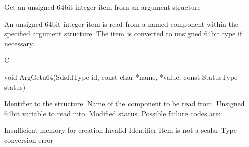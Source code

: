 \begin{manroutinedescription}
      Get an unsigned 64bit integer item from an argument structure

      An unsigned 64bit integer item is read from a named component within the
      specified argument structure. The item is converted to unsigned 64bit
      type if necessary.
 
      C

      void ArgGetu64(SdsIdType id, const char *name, {} *value, %
const StatusType {\mantt{*}} status)
 
\begin{manparametertable}
 Identifier to the structure.
 Name of the component to be read %
from.
 Unsigned 64bit %
variable to read into.
 Modified status. Possible %
failure codes are:
\end{manparametertable}
\begin{mantwocolumntable}
Insufficient memory for creation
Invalid Identifier
Item is not a scalar
Type conversion error
\end{mantwocolumntable}
\end{manroutinedescription}
